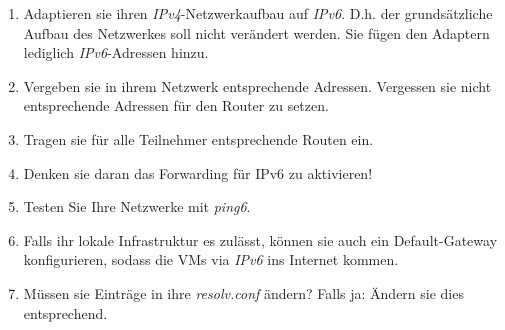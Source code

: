 \documentclass[paper=a4,fontsize=11pt]{scrartcl}%
\begin{document}
\begin{enumerate}
	\item Adaptieren sie ihren \emph{IPv4}-Netzwerkaufbau auf \emph{IPv6}. D.h. der grundsätzliche Aufbau des Netzwerkes soll nicht verändert werden. Sie fügen den Adaptern lediglich \emph{IPv6}-Adressen hinzu.
	\item Vergeben sie in ihrem Netzwerk entsprechende Adressen. Vergessen sie nicht entsprechende Adressen für den Router zu setzen.
	\item Tragen sie für alle Teilnehmer entsprechende Routen ein.
	\item Denken sie daran das Forwarding für IPv6 zu aktivieren!
	\item Testen Sie Ihre Netzwerke mit \emph{ping6}.
	\item Falls ihr lokale Infrastruktur es zulässt, können sie auch ein Default-Gateway konfigurieren, sodass die VMs via \emph{IPv6} ins Internet kommen.
	\item Müssen sie Einträge in ihre \emph{resolv.conf} ändern? Falls ja: Ändern sie dies entsprechend.
\end{enumerate}
\end{document}

